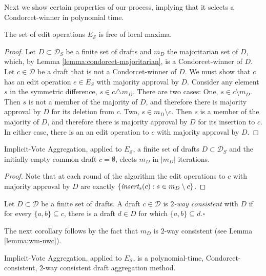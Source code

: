 \documentclass[sigconf]{aamas}  %
\newcommand{\qqed}{\hfill$\square$}
\newcommand{\calD}{\mathcal{D}}
\newcommand{\calS}{\mathcal{S}}
\newcommand{\iinsert}[1]{\emph{insert}_{#1}}
\begin{document}
Next we show certain properties of our process, implying that it selects a Condorcet-winner in polynomial time.

\begin{lemma}
  The set of edit operations $E_\calS$ is free of local maxima.
\end{lemma}

\begin{proof}
%
Let $D \subset \calD_S$ be a finite set of drafts and $m_D$ the majoritarian set of $D$, which, by Lemma \ref{lemma:condorcet-majoritarian}, is a Condorcet-winner of $D$.  Let $c \in \calD$ be a draft that is not a Condorcet-winner of $D$. We must show that
$c$ has an edit operation $e \in E_S$ with majority approval by $D$. Consider any  element $s$ in the symmetric difference,  $s \in c \triangle m_D$.
There are two cases: One, $s \in c \setminus m_D$. Then $s$ is not a member of the majority of $D$, and therefore there is majority approval by $D$ for its deletion from $c$.
Two, $s \in m_D \setminus c$. Then $s$ is a member of the majority of $D$, and therefore there is majority approval by $D$ for its insertion to  $c$. In either case, there is an an edit operation to $c$ with majority approval by $D$.
%
\end{proof}

\begin{lemma}
Implicit-Vote Aggregation, applied to $E_\calS$,  a finite set of drafts $D \subset \calD_S$ and the initially-empty common draft $c = \emptyset$, elects $m_D$ in $|m_D|$ iterations.
\end{lemma}

\begin{proof}
Note that at each round of the algorithm the edit operations to $c$ with majority approval by $D$ are exactly $\{\iinsert{s}(c) : s \in m_D \setminus c\}$.
\end{proof}

\begin{definition}
Let $D \subset \calD$ be a finite set of drafts. A draft $c \in \calD$ is \emph{$2$-way consistent} with $D$ if for every $\{a,b\} \subseteq c$, there is a draft $d \in D$ for which $\{a,b\} \subseteq d$.\qqed
\end{definition}

The next corollary follows by the fact that $m_D$ is $2$-way consistent (see Lemma \ref{lemma:wm-nwc}).

\begin{corollary}
Implicit-Vote Aggregation, applied to $E_\calS$, is a polynomial-time, Condorcet-consistent, $2$-way consistent draft aggregation method.
\end{corollary}
\end{document}
